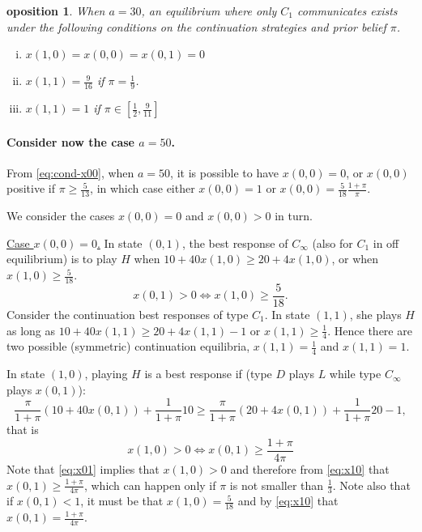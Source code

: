 \documentclass[12pt]{article}
\newtheorem{proposition}{\text{Pr}oposition}
\theoremstyle{definition}
\theoremstyle{remark}
\begin{document}
\begin{proposition}\label{prop:CT30-C1}
    When $a=30$, an equilibrium where only $C_1$ communicates exists under the following conditions on the continuation strategies and prior belief $\pi$.
    \begin{enumerate}[(i)]
        \item $x(1,0)=x(0,0)=x(0,1)=0$ 
         \item $x(1,1)=\frac{9}{16}$ if $\pi = \frac{1}{9}$.
         \item $x(1,1) = 1$ if $\pi\in \left[\frac{1}{2}, \frac{9}{11}\right]$
    \end{enumerate}
\end{proposition}

\paragraph{Consider now the case $a=50$.} 
From \eqref{eq:cond-x00}, when $a=50$, it is possible to have $x(0,0)=0$, or $x(0,0)$ positive if  $\pi\geq\frac{5}{13}$, in which case either $x(0,0)=1$ or $x(0,0)=\frac{5}{18}\frac{1+\pi}{\pi}$. 

We consider the cases $x(0,0)=0$ and $x(0,0)>0$ in turn.

\underline{Case $x(0,0)=0$.} In state $(0,1)$, the best response of $C_\infty$ (also for $C_1$ in off equilibrium) is to play $H$ when $10+40x(1,0)\geq 20+4x(1,0)$, or when $x(1,0)\geq \frac{5}{18}$.
%
\begin{equation}\label{eq:x01}
    x(0,1)>0 \Leftrightarrow x(1,0)\geq \frac{5}{18}.
\end{equation}
%
Consider the continuation best responses of type $C_1$. In state $(1,1)$, she plays $H$ as long as $10+40x(1,1)\geq 20+4x(1,1)-1$ or $x(1,1)\geq \frac{1}{4}$. Hence there are two possible (symmetric) continuation equilibria, $x(1,1)=\frac{1}{4}$ and $x(1,1)=1$. 

In state $(1,0)$, playing $H$ is a best response if (type $D$ plays $L$ while type $C_\infty$ plays $x(0,1)$):
\[
\frac{\pi}{1+\pi}(10+40 x(0,1))+\frac{1}{1+\pi}10\geq \frac{\pi}{1+\pi}(20+4 x(0,1))+\frac{1}{1+\pi}20 -1,
\]
that is 
\begin{equation}\label{eq:x10}
    x(1,0)>0 \Leftrightarrow x(0,1)\geq \frac{1+\pi}{4\pi}
\end{equation}
%
Note that \eqref{eq:x01} implies that $x(1,0)>0$ and therefore from \eqref{eq:x10} that $x(0,1)\geq \frac{1+\pi}{4\pi} $, which can happen only if $\pi$ is not smaller than $\frac{1}{3}$. Note also that if $x(0,1)<1$, it must be that $x(1,0)=\frac{5}{18}$ and by \eqref{eq:x10} that $x(0,1)=\frac{1+\pi}{4\pi}$.
\end{document}
